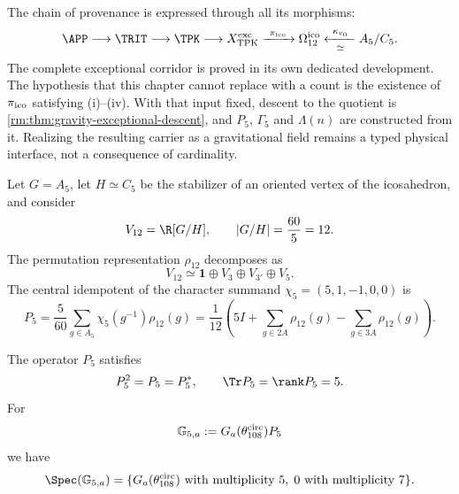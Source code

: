 The chain of provenance is expressed through all its morphisms:
\begin{equation}
\label{rm:eq:gravity-exceptional-provenance}
\APP\longrightarrow\TRIT\longrightarrow\TPK
\longrightarrow X_{\rm TPK}^{\rm exc}
\xrightarrow{\ \pi_{\rm ico}\ }\Omega_{12}^{\rm ico}
\xleftarrow[\simeq]{\ \kappa_{v_0}\ }A_5/C_5.
\end{equation}
The complete exceptional corridor is proved in its own dedicated development. The hypothesis that this chapter cannot replace with a count is the existence of \(\pi_{\rm ico}\) satisfying (i)--(iv). With that input fixed, descent to the quotient is \cref{rm:thm:gravity-exceptional-descent}, and \(P_5\), \(\Gamma_5\) and \(\Lambda(n)\) are constructed from it. Realizing the resulting carrier as a gravitational field remains a typed physical interface, not a consequence of cardinality.

Let \(G=A_5\), let \(H\simeq C_5\) be the stabilizer of an oriented vertex
of the icosahedron, and consider
\begin{equation}
\label{rm:eq:gravity-v12}
V_{12}=\R[G/H],
\qquad |G/H|=\frac{60}{5}=12.
\end{equation}
The permutation representation \(\rho_{12}\) decomposes as
\begin{equation}
\label{rm:eq:gravity-v12-decomposition}
V_{12}\simeq\mathbf1\oplus V_3\oplus V_{3'}\oplus V_5.
\end{equation}
The central idempotent of the character summand
\(\chi_5=(5,1,-1,0,0)\) is
\begin{equation}
\label{rm:eq:gravity-p5}
\boxed{
P_5=\frac5{60}\sum_{g\in A_5}\chi_5(g^{-1})\rho_{12}(g)
=\frac1{12}\left(
5I+\sum_{g\in2A}\rho_{12}(g)
-\sum_{g\in3A}\rho_{12}(g)
\right).}
\end{equation}

\begin{theorem}
\label{rm:thm:gravity-p5-coupling}
The operator \(P_5\) satisfies
\begin{equation}
\label{rm:eq:gravity-p5-properties}
P_5^2=P_5=P_5^*,
\qquad \Tr P_5=\rank P_5=5.
\end{equation}
For
\begin{equation}
\label{rm:eq:gravity-G5}
\mathbb G_{5,a}:=G_a(\theta_{108}^{\rm circ})P_5
\end{equation}
we have
\begin{equation}
\label{rm:eq:gravity-G5-spectrum}
\Spec(\mathbb G_{5,a})
=\{G_a(\theta_{108}^{\rm circ})\text{ with multiplicity }5,
\;0\text{ with multiplicity }7\}.
\end{equation}
\end{theorem}

